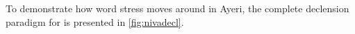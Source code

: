 % 
% 
% 
%
To demonstrate how word stress moves around in Ayeri, the complete declension 
paradigm for  is presented in \autoref{fig:nivadecl}.

